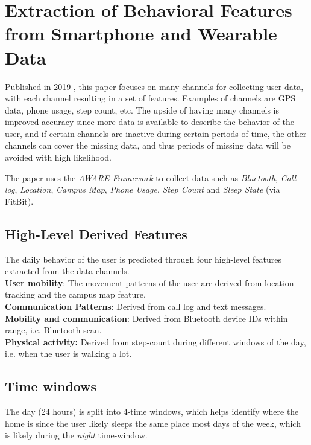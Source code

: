\section{Extraction of Behavioral Features from Smartphone and Wearable Data}
Published in 2019 \cite{extraction-of-behavioural-features}, this paper focuses on many channels for collecting user data, with each channel resulting in a set of features. Examples of channels are GPS data, phone usage, step count, etc. The upside of having many channels is improved accuracy since more data is available to describe the behavior of the user, and if certain channels are inactive during certain periods of time, the other channels can cover the missing data, and thus periods of missing data will be avoided with high likelihood. 

The paper uses the \textit{AWARE Framework }\cite{aware2015} to collect data such as  \textit{Bluetooth}, \textit{Call-log}, \textit{Location}, \textit{Campus Map}, \textit{Phone Usage}, \textit{Step Count} and \textit{Sleep State} (via FitBit).

\subsection{ High-Level Derived Features}
The daily behavior of the user is predicted through four high-level features extracted from the data channels.\\

\textbf{User mobility}: The movement patterns of the user are derived from location tracking and the campus map feature.\\ 

\textbf{Communication Patterns}: Derived from call log and text messages.\\

\textbf{Mobility and communication}: Derived from Bluetooth device IDs within range, i.e. Bluetooth scan.\\

\textbf{Physical activity:} Derived from step-count during different windows of the day, i.e. when the user is walking a lot.\\

\subsection{Time windows}
The day (24 hours) is split into 4-time windows, which helps identify where the home is since the user likely sleeps the same place most days of the week, which is likely during the \textit{night} time-window.

